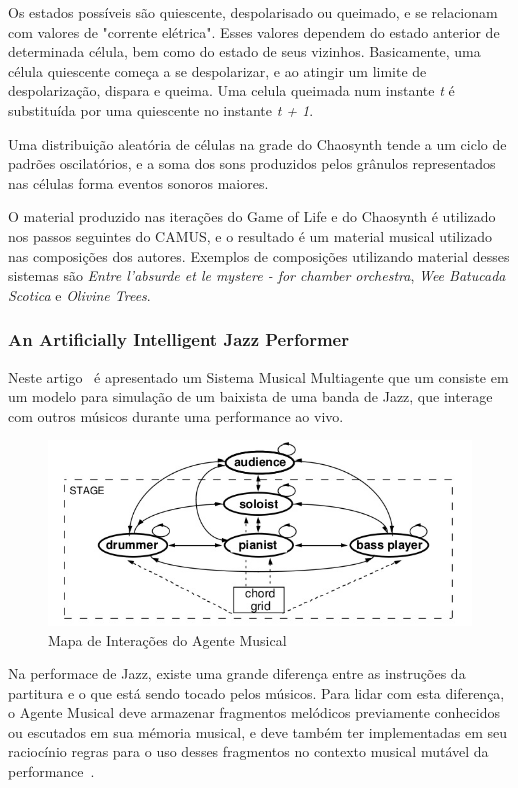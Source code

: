 \documentclass[a4paper, 11pt, twoside]{article}
\begin{document}
\begin{multicols}{2}
Os estados possíveis são quiescente, despolarisado ou queimado, e se relacionam
com valores de "corrente elétrica". Esses valores dependem do estado anterior 
de determinada célula, bem como do estado de seus vizinhos. Basicamente, uma 
célula quiescente começa a se despolarizar, e ao atingir um limite de 
despolarização, dispara e queima. Uma celula queimada num instante \textit{t} 
é substituída por uma quiescente no instante \textit{t + 1}.

Uma distribuição aleatória de células na grade do Chaosynth tende a um ciclo de
padrões oscilatórios, e a soma dos sons produzidos pelos grânulos representados
nas células forma eventos sonoros maiores.

O material produzido nas iterações do Game of Life e do Chaosynth é utilizado 
nos passos seguintes do CAMUS, e o resultado é um material musical utilizado 
nas composições dos autores. Exemplos de composições utilizando 
material desses sistemas são 
\textit{Entre l'absurde et le mystere - for chamber orchestra}, 
\textit{Wee Batucada Scotica} e \textit{Olivine Trees}.

\subsubsection{An Artificially Intelligent Jazz Performer}

Neste artigo~\cite{ramalho99} é apresentado um Sistema Musical Multiagente que 
um consiste em um modelo para simulação de um baixista de uma banda de Jazz, 
que interage com outros músicos durante uma performance ao vivo.

\begin{figure}[H]
  \centering
  \includegraphics[scale=0.44]{jazz.jpg}
  \caption{Mapa de Interações do Agente Musical~\cite{ramalho99}}
  \label{fig:mapa}
\end{figure}

Na performace de Jazz, existe uma grande diferença entre as instruções da 
partitura e o que está sendo tocado pelos músicos. Para lidar com esta 
diferença, o Agente Musical deve armazenar fragmentos melódicos previamente 
conhecidos ou escutados em sua mémoria musical, e deve também ter implementadas
em seu raciocínio regras para o uso desses fragmentos no contexto musical 
mutável da performance~\cite{ramalho99}.


\end{multicols}
\end{document}
